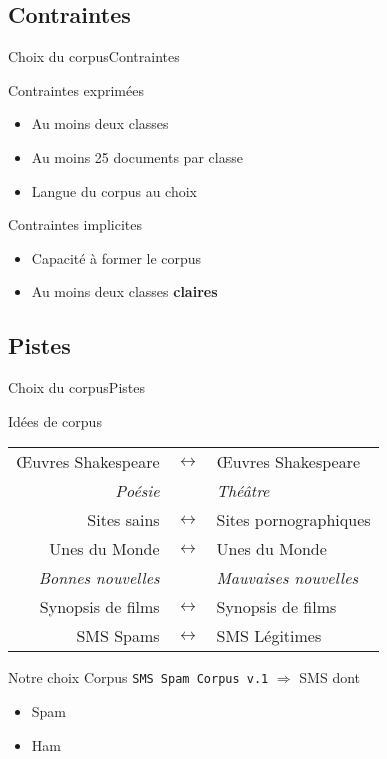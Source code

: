 \subsection{Contraintes}
\begin{frame}{Choix du corpus}{Contraintes}
\begin{block}{Contraintes exprimées}
	\begin{itemize}
	\item Au moins deux classes
	\item Au moins 25 documents par classe
	\item Langue du corpus au choix
	\end{itemize}
\end{block}
\pause
\begin{block}{Contraintes implicites}
	\begin{itemize}
	\item Capacité à former le corpus
	\item Au moins deux classes \textbf{claires}
	\end{itemize}
\end{block}
\end{frame}

\subsection{Pistes}
\begin{frame}{Choix du corpus}{Pistes}
\begin{block}{Idées de corpus}
\begin{center}
	\begin{tabular}{|r c l|}
	\hline
	Œuvres Shakespeare & $\leftrightarrow$ & Œuvres Shakespeare \\
	\textit{Poésie} & & \textit{Théâtre} \\
	\hline
	Sites sains & $\leftrightarrow$ & Sites pornographiques \\
	\hline
	Unes du Monde & $\leftrightarrow$ & Unes du Monde \\
	\textit{Bonnes nouvelles} & & \textit{Mauvaises nouvelles} \\
	\hline
	Synopsis de films & $\leftrightarrow$ & Synopsis de films \\	
	\hline
	SMS Spams & $\leftrightarrow$ & SMS Légitimes \\	
	\hline
	\end{tabular}
\end{center}
\end{block}
\pause
\begin{block}{Notre choix}
Corpus \texttt{SMS Spam Corpus v.1} $\Rightarrow$  SMS dont
		\begin{itemize}
			\item {} Spam
			\item {} Ham
		\end{itemize}
\end{block}
\end{frame}

